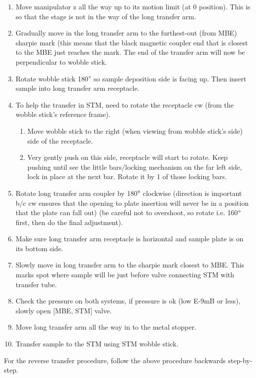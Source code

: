\begin{enumerate}
	\item	Move manipulator z all the way up to its motion limit (at 0 position). This is so that the stage is not in the way of the long transfer arm.
	\item	Gradually move in the long transfer arm to the furthest-out (from MBE) sharpie mark (this means that the black magnetic coupler end that is closest to the MBE just reaches the mark. The end of the transfer arm will now be perpendicular to wobble stick.
	\item Rotate wobble stick 180$\degree$ so sample deposition side is facing up. Then insert sample into long transfer arm receptacle.
	\item	To help the transfer in STM, need to rotate the receptacle cw (from the wobble stick’s reference frame).
	\begin{enumerate}
		\item	Move wobble stick to the right (when viewing from wobble stick’s side) side of the receptacle.
		\item	Very gently push on this side, receptacle will start to rotate. Keep pushing until see the little bars/locking mechanism on the far left side, lock in place at the next bar. Rotate it by 1 of those locking bars.
	\end{enumerate}
\item	Rotate long transfer arm coupler by 180$\degree$ clockwise (direction is important b/c cw ensures that the opening to plate insertion will never be in a position that the plate can fall out) (be careful not to overshoot, so rotate i.e. 160$\degree$ first, then do the final adjustment). 
	\item	Make sure long transfer arm receptacle is horizontal and sample plate is on its bottom side.

	\item	Slowly move in long transfer arm to the sharpie mark closest to MBE.  This marks spot where sample will be just before valve connecting STM with transfer tube.
	\item	Check the pressure on both systems, if pressure is ok (low E-9mB or less), slowly open [MBE, STM] valve.
	\item	Move long transfer arm all the way in to the metal stopper.
	\item	Transfer sample to the STM using STM wobble stick.
	\end{enumerate}
	For the reverse transfer procedure, follow the above procedure backwards step-by-step.
	
